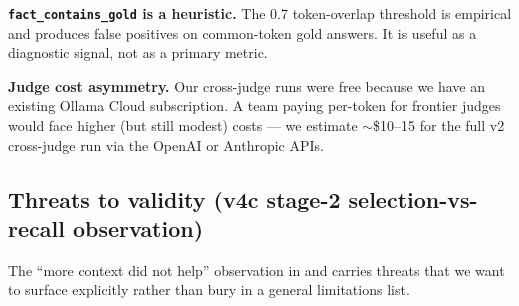 \documentclass{article}
\begin{document}
\textbf{\texttt{fact\_contains\_gold} is a heuristic.} The 0.7 token-overlap threshold is empirical and produces false positives on common-token gold answers. It is useful as a diagnostic signal, not as a primary metric.

\textbf{Judge cost asymmetry.} Our cross-judge runs were free because we have an existing Ollama Cloud subscription. A team paying per-token for frontier judges would face higher (but still modest) costs --- we estimate $\sim$\$10--15 for the full v2 cross-judge run via the OpenAI or Anthropic APIs.

\subsection{Threats to validity (v4c stage-2 selection-vs-recall observation)}
\label{sec:threats}

The ``more context did not help'' observation in  and  carries threats that we want to surface explicitly rather than bury in a general limitations list.
\end{document}
